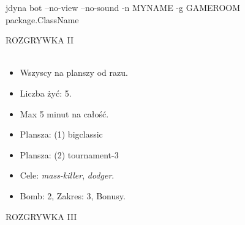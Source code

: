 \documentclass[compress]{beamer}
\begin{document}
\begin{frame}
    \begin{screenblock}[fontsize=\Large, numbers=none]
jdyna bot --no-view --no-sound 
  -n MYNAME -g GAMEROOM package.ClassName
    \end{screenblock}
\end{frame}


\begin{frame}[plain]
    \begin{center}
    ROZGRYWKA II\\[1cm]
    \\[1cm]
    \end{center}
\end{frame}

\begin{frame}[plain]
\end{frame}

\begin{frame}[plain]
    
    \bigskip
    \begin{itemize}
        \item Wszyscy na planszy od razu.
        \item Liczba żyć: 5.
        \item Max 5 minut na całość.
        \item Plansza: (1) bigclassic
        \item Plansza: (2) tournament-3
        \item Cele: \emph{mass-killer}, \emph{dodger}.

        \bigskip\color{gray}
        \item Bomb: 2, Zakres: 3, Bonusy. 
    \end{itemize}
\end{frame}


\begin{frame}[plain]
    \begin{center}
    ROZGRYWKA III\\[1cm]
    \\[1cm]
    \end{center}
\end{frame}
\end{document}
